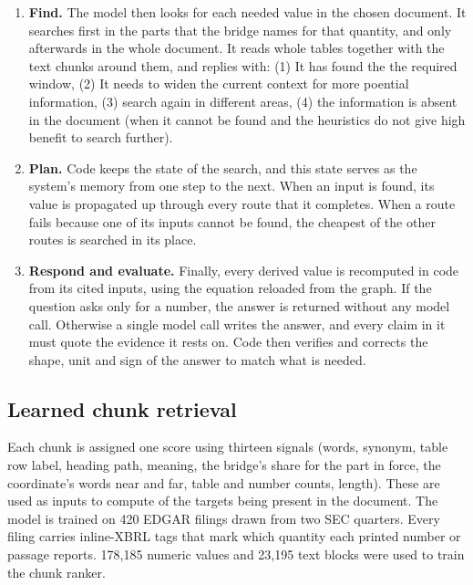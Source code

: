 \begin{enumerate}[label=(\arabic*)]
  \item \textbf{Find.} The model then looks for each needed value in the chosen document. It searches first in the parts that the bridge names for that quantity, and only afterwards in the whole document. It reads whole tables together with the text chunks around them, and replies with: (1) It has found the the required window, (2) It needs to widen the current context for more poential information, (3) search again in different areas, (4) the information is absent in the document (when it cannot be found and the heuristics do not give high benefit to search further).
  \item \textbf{Plan.} Code keeps the state of the search, and this state serves as the system's memory from one step to the next. When an input is found, its value is propagated up through every route that it completes. When a route fails because one of its inputs cannot be found, the cheapest of the other routes is searched in its place.
  \item \textbf{Respond and evaluate.} Finally, every derived value is recomputed in code from its cited inputs, using the equation reloaded from the graph. If the question asks only for a number, the answer is returned without any model call. Otherwise a single model call writes the answer, and every claim in it must quote the evidence it rests on. Code then verifies and corrects the shape, unit and sign of the answer to match what is needed.
\end{enumerate}



\subsection{Learned chunk retrieval}
\label{sec:impl-retrieval}

Each chunk is assigned one score using thirteen signals (words, synonym, table row label, heading path, meaning, the bridge's share for the part in force, the coordinate's words near and far, table and number counts, length). These are used as inputs to compute of the targets being present in the document. The model is trained on 420 EDGAR filings drawn from two SEC quarters. Every filing carries
inline-XBRL tags that mark which quantity each printed number or passage
reports. 178,185 numeric values and 23,195 text blocks were used to train the chunk ranker.